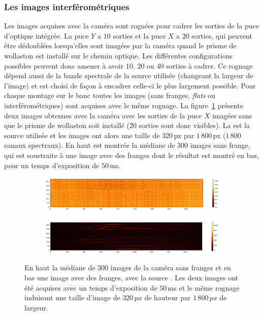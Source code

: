 \subsubsection{Les images interférométriques}

Les images acquises avec la caméra sont rognées pour cadrer les sorties de la puce d'optique intégrée. La puce $Y$ a $10$ sorties et la puce $X$ a $20$ sorties, qui peuvent être dédoublées lorsqu'elles sont imagées par la caméra quand le prisme de wollaston est installé sur le chemin optique. Les différentes configurations possibles peuvent donc amener à avoir $10$, $20$ ou $40$ sorties à cadrer. Ce rognage dépend aussi de la bande spectrale de la source utilisée (changeant la largeur de l'image) et est choisi de façon à encadrer celle-ci le plus largement possible. Pour chaque montage sur le banc toutes les images (sans franges, \textit{flats} ou interférométriques) sont acquises avec le même rognage. La figure~\ref{fig:FringeCrop} présente deux images obtenues avec la caméra avec les sorties de la puce $X$ imagées sans que le prisme de wollaston soit installé ($20$ sorties sont donc visibles). La \sk est la source utilisée et les images ont alors une taille de $320 \,$px par $1\,800 \,$px ($1\,800$ canaux spectraux). En haut est montrée la médiane de $300$ images sans frange, qui est soustraite à une image avec des franges dont le résultat est montré en bas, pour un temps d'exposition de $50 \,$ms.

\begin{figure}[ht!]
    \centering
    \begin{subfigure}{0.9\textwidth}
        \includegraphics[width=\textwidth]{Figure_Chap3/20220614_P2VM_Dark1_50ms_median300.png}
    \end{subfigure}
    \begin{subfigure}{0.9\textwidth}
        \includegraphics[width=\textwidth]{Figure_Chap3/20220614_P2VM_FullOn_001_50ms_Im0_SubDark.png}
    \end{subfigure}
    \caption[Image interférométrique obtenues sur FIRSTv2.]{En haut la médiane de $300$ images de la caméra sans franges et en bas une image avec des franges, avec la source \sk. Les deux images ont été acquises avec un temps d'exposition de $50 \,$ms et le même rognage induisant une taille d'image de $320 \, px$ de hauteur par $1\,800 \, px$ de largeur.}
    \label{fig:FringeCrop}
\end{figure}

